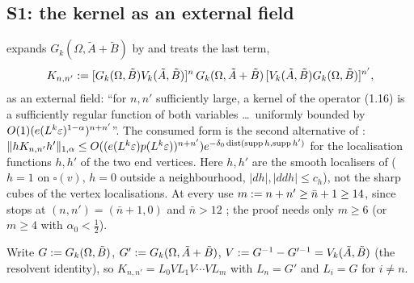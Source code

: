 
\subsection{S1: the kernel \cite[(1.16)]{Ba3} as an external field}\label{sup1:ssec:S1}

\cite[p.~414]{Ba3} expands $G_k(\Omega,\tilde A+\tilde B)$ by \cite[(3.44)--(3.45)]{Ba1} and treats the last term,
\begin{equation}\label{sup1:eq:116}
K_{n,n'}:=[G_k(\Omega,\tilde B)V_k(\tilde A,\tilde B)]^n\,G_k(\Omega,\tilde A+\tilde B)\,[V_k(\tilde A,\tilde B)G_k(\Omega,\tilde B)]^{n'},
\end{equation}
as an external field: ``for $n,n'$ sufficiently large, a kernel of the operator (1.16) is a sufficiently regular function of both variables \dots\ uniformly bounded by $O(1)(e(L^k\varepsilon)^{1-\alpha})^{n+n'}$''. The consumed form is the second alternative of \cite[(2.5)]{Ba3}: $\lVert hK_{n,n'}h'\rVert_{1,\alpha}\le O((e(L^k\varepsilon)p(L^k\varepsilon))^{n+n'})e^{-\delta_0\operatorname{dist}(\operatorname{supp} h,\operatorname{supp} h')}$ for the localisation functions $h,h'$ of the two end vertices. Here $h,h'$ are the smooth localisers of \cite[(1.33), p.~420]{Ba3} ($h=1$ on $\square(v)$, $h=0$ outside a neighbourhood, $|dh|,|ddh|\le c_h$), not the sharp cubes of the vertex localisations. At every use $m:= n+n'\ge\bar n+1\ge14$, since \cite[(3.45)]{Ba1} stops at $(n,n')=(\bar n+1,0)$ and $\bar n>12$ \cite[p.~421]{Ba3}; the proof needs only $m\ge6$ (or $m\ge4$ with $\alpha_0<\frac12$).

Write $G:= G_k(\Omega,\tilde B)$, $G':= G_k(\Omega,\tilde A+\tilde B)$, $V:= G^{-1}-G'^{-1}=V_k(\tilde A,\tilde B)$ (the resolvent identity), so $K_{n,n'}=L_0VL_1V\cdots VL_m$ with $L_n=G'$ and $L_i=G$ for $i\ne n$.

